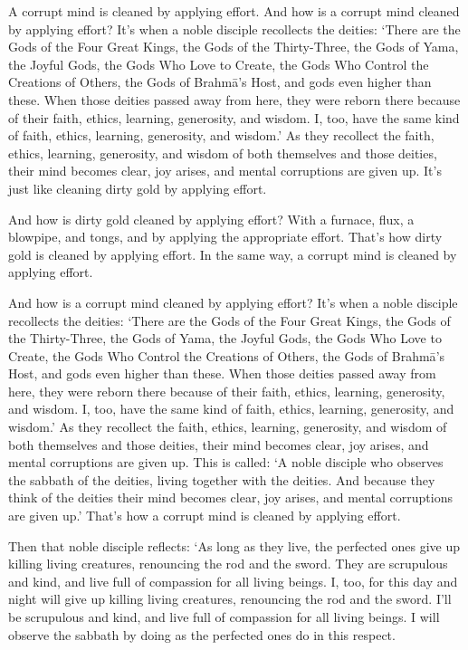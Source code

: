 \documentclass[12pt,openany]{book}%
\begin{document}
A corrupt mind is cleaned by applying effort. And how is a corrupt mind cleaned by applying effort? It’s when a noble disciple recollects the deities: ‘There are the Gods of the Four Great Kings, the Gods of the Thirty-Three, the Gods of Yama, the Joyful Gods, the Gods Who Love to Create, the Gods Who Control the Creations of Others, the Gods of \textsanskrit{Brahmā}’s Host, and gods even higher than these. When those deities passed away from here, they were reborn there because of their faith, ethics, learning, generosity, and wisdom. I, too, have the same kind of faith, ethics, learning, generosity, and wisdom.’ As they recollect the faith, ethics, learning, generosity, and wisdom of both themselves and those deities, their mind becomes clear, joy arises, and mental corruptions are given up. It’s just like cleaning dirty gold by applying effort. 

And how is dirty gold cleaned by applying effort? With a furnace, flux, a blowpipe, and tongs, and by applying the appropriate effort. That’s how dirty gold is cleaned by applying effort. In the same way, a corrupt mind is cleaned by applying effort. 

And how is a corrupt mind cleaned by applying effort? It’s when a noble disciple recollects the deities: ‘There are the Gods of the Four Great Kings, the Gods of the Thirty-Three, the Gods of Yama, the Joyful Gods, the Gods Who Love to Create, the Gods Who Control the Creations of Others, the Gods of \textsanskrit{Brahmā}’s Host, and gods even higher than these. When those deities passed away from here, they were reborn there because of their faith, ethics, learning, generosity, and wisdom. I, too, have the same kind of faith, ethics, learning, generosity, and wisdom.’ As they recollect the faith, ethics, learning, generosity, and wisdom of both themselves and those deities, their mind becomes clear, joy arises, and mental corruptions are given up. This is called: ‘A noble disciple who observes the sabbath of the deities, living together with the deities. And because they think of the deities their mind becomes clear, joy arises, and mental corruptions are given up.’ That’s how a corrupt mind is cleaned by applying effort. 

Then that noble disciple reflects: ‘As long as they live, the perfected ones give up killing living creatures, renouncing the rod and the sword. They are scrupulous and kind, and live full of compassion for all living beings. I, too, for this day and night will give up killing living creatures, renouncing the rod and the sword. I’ll be scrupulous and kind, and live full of compassion for all living beings. I will observe the sabbath by doing as the perfected ones do in this respect. 
\end{document}
